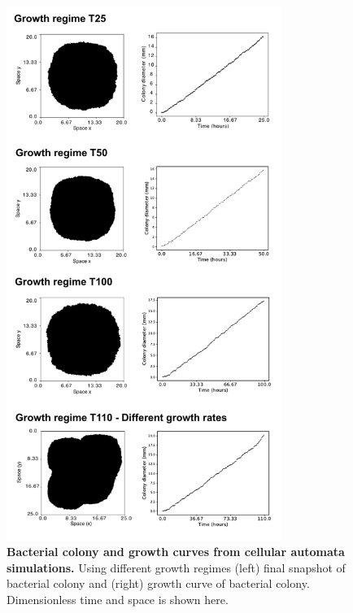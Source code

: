 \begin{figure}[H] %
    \centering
    \begin{adjustbox}{center}
        \includegraphics[width=0.8\textwidth]{chapters/Appendix/ca_growth_regimes} %
    \end{adjustbox}
    \caption{\textbf{Bacterial colony and growth curves from cellular automata simulations.} Using different growth regimes (left) final snapshot of bacterial colony and (right) growth curve of bacterial colony. Dimensionless time and space is shown here. }
    \label{fig:ca_growth_regimes}
\end{figure}


